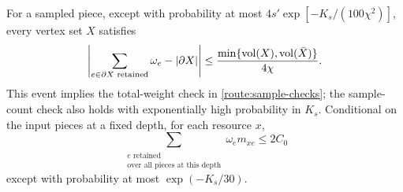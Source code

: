 \begin{lemma}
\label{route:sampling}
For a sampled piece, except with probability at most
$4s'\exp[-K_s/(100\chi^2)]$, every vertex set $X$ satisfies
\begin{equation}\label{route:cut-approximation}
 \left|\sum_{e\in\partial X\text{ retained}}\omega_e
                -|\partial X|\right|
 \le\frac{\min\{\operatorname{vol}(X),\operatorname{vol}(\bar X)\}}{4\chi}.
\end{equation}
This event implies the total-weight check in
\eqref{route:sample-checks}; the sample-count check also holds with
exponentially high probability in $K_s$.  Conditional on the input
pieces at a fixed depth, for each resource $x$,
\begin{equation}\label{route:sample-resources}
 \sum_{\substack{e\text{ retained}\\\text{over all pieces at this depth}}}
          \omega_e m_{xe}\le2C_0
\end{equation}
except with probability at most $\exp(-K_s/30)$.
\end{lemma}

